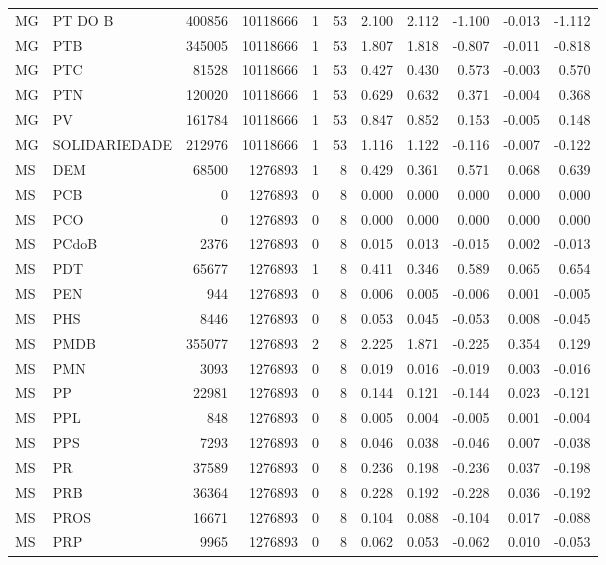 \begin{landscape}
\begin{longtable}{llrrrrrrrrr}
MG & PT DO B & 400856 & 10118666 & 1 & 53 & 2.100 & 2.112 & -1.100 & -0.013 & -1.112 \\
MG & PTB & 345005 & 10118666 & 1 & 53 & 1.807 & 1.818 & -0.807 & -0.011 & -0.818 \\
MG & PTC & 81528 & 10118666 & 1 & 53 & 0.427 & 0.430 & 0.573 & -0.003 & 0.570 \\
MG & PTN & 120020 & 10118666 & 1 & 53 & 0.629 & 0.632 & 0.371 & -0.004 & 0.368 \\
MG & PV & 161784 & 10118666 & 1 & 53 & 0.847 & 0.852 & 0.153 & -0.005 & 0.148 \\
MG & SOLIDARIEDADE & 212976 & 10118666 & 1 & 53 & 1.116 & 1.122 & -0.116 & -0.007 & -0.122 \\
MS & DEM & 68500 & 1276893 & 1 & 8 & 0.429 & 0.361 & 0.571 & 0.068 & 0.639 \\
MS & PCB & 0 & 1276893 & 0 & 8 & 0.000 & 0.000 & 0.000 & 0.000 & 0.000 \\
MS & PCO & 0 & 1276893 & 0 & 8 & 0.000 & 0.000 & 0.000 & 0.000 & 0.000 \\
MS & PCdoB & 2376 & 1276893 & 0 & 8 & 0.015 & 0.013 & -0.015 & 0.002 & -0.013 \\
MS & PDT & 65677 & 1276893 & 1 & 8 & 0.411 & 0.346 & 0.589 & 0.065 & 0.654 \\
MS & PEN & 944 & 1276893 & 0 & 8 & 0.006 & 0.005 & -0.006 & 0.001 & -0.005 \\
MS & PHS & 8446 & 1276893 & 0 & 8 & 0.053 & 0.045 & -0.053 & 0.008 & -0.045 \\
MS & PMDB & 355077 & 1276893 & 2 & 8 & 2.225 & 1.871 & -0.225 & 0.354 & 0.129 \\
MS & PMN & 3093 & 1276893 & 0 & 8 & 0.019 & 0.016 & -0.019 & 0.003 & -0.016 \\
MS & PP & 22981 & 1276893 & 0 & 8 & 0.144 & 0.121 & -0.144 & 0.023 & -0.121 \\
MS & PPL & 848 & 1276893 & 0 & 8 & 0.005 & 0.004 & -0.005 & 0.001 & -0.004 \\
MS & PPS & 7293 & 1276893 & 0 & 8 & 0.046 & 0.038 & -0.046 & 0.007 & -0.038 \\
MS & PR & 37589 & 1276893 & 0 & 8 & 0.236 & 0.198 & -0.236 & 0.037 & -0.198 \\
MS & PRB & 36364 & 1276893 & 0 & 8 & 0.228 & 0.192 & -0.228 & 0.036 & -0.192 \\
MS & PROS & 16671 & 1276893 & 0 & 8 & 0.104 & 0.088 & -0.104 & 0.017 & -0.088 \\
MS & PRP & 9965 & 1276893 & 0 & 8 & 0.062 & 0.053 & -0.062 & 0.010 & -0.053 \\

\end{longtable}
\end{landscape}
